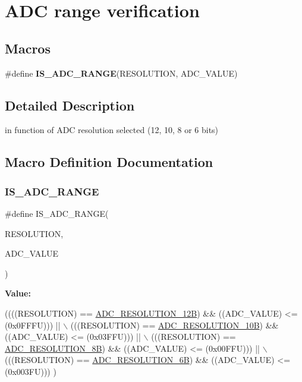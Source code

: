 \hypertarget{group___a_d_c__range__verification}{}\section{A\+DC range verification}
\label{group___a_d_c__range__verification}
\subsection*{Macros}
\begin{DoxyCompactItemize}
\item 
\#define {\bfseries I\+S\+\_\+\+A\+D\+C\+\_\+\+R\+A\+N\+GE}(R\+E\+S\+O\+L\+U\+T\+I\+ON,  A\+D\+C\+\_\+\+V\+A\+L\+UE)
\end{DoxyCompactItemize}


\subsection{Detailed Description}
in function of A\+DC resolution selected (12, 10, 8 or 6 bits) 

\subsection{Macro Definition Documentation}
\mbox{\label{group___a_d_c__range__verification_gadee1b27b756df7927be40709e96218c0}} 
\subsubsection{\texorpdfstring{I\+S\+\_\+\+A\+D\+C\+\_\+\+R\+A\+N\+GE}{IS\_ADC\_RANGE}}
{\footnotesize\ttfamily \#define I\+S\+\_\+\+A\+D\+C\+\_\+\+R\+A\+N\+GE(\begin{DoxyParamCaption}\item[{}]{R\+E\+S\+O\+L\+U\+T\+I\+ON,  }\item[{}]{A\+D\+C\+\_\+\+V\+A\+L\+UE }\end{DoxyParamCaption})}

{\bfseries Value\+:}
\begin{DoxyCode}
((((RESOLUTION) == \hyperlink{group___a_d_c___resolution_ga49c8408a1cdbf97bbf29234c3770fa74}{ADC\_RESOLUTION\_12B}) && ((ADC\_VALUE) <= (0x0FFFU))) || \(\backslash\)
    (((RESOLUTION) == \hyperlink{group___a_d_c___resolution_ga91289e269eb3080d25301909c0f417e5}{ADC\_RESOLUTION\_10B}) && ((ADC\_VALUE) <= (0x03FFU))) || \(\backslash\)
    (((RESOLUTION) == \hyperlink{group___a_d_c___resolution_ga39925af93719877bdcc5664e4b95e69a}{ADC\_RESOLUTION\_8B})  && ((ADC\_VALUE) <= (0x00FFU))) || \(\backslash\)
    (((RESOLUTION) == \hyperlink{group___a_d_c___resolution_ga24c5226e05db78b4065f2f187d497b04}{ADC\_RESOLUTION\_6B})  && ((ADC\_VALUE) <= (0x003FU)))   )
\end{DoxyCode}
